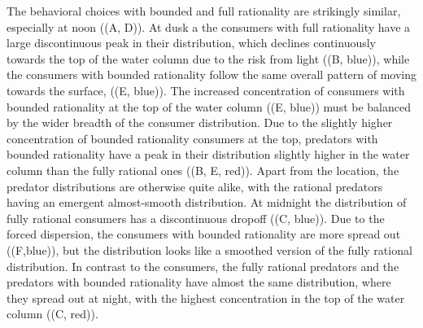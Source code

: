 The behavioral choices with bounded and full rationality are strikingly similar, especially at noon ((A, D)). At dusk a the consumers with full rationality have a large discontinuous peak in their distribution, which declines continuously towards the top of the water column due to the risk from light ((B, blue)), while the consumers with bounded rationality follow the same overall pattern of moving towards the surface, ((E, blue)). The increased concentration of consumers with bounded rationality at the top of the water column ((E, blue)) must be balanced by the wider breadth of the consumer distribution. Due to the slightly higher concentration of bounded rationality consumers at the top, predators with bounded rationality have a peak in their distribution slightly higher in the water column than the fully rational ones ((B, E, red)). Apart from the location, the predator distributions are otherwise quite alike, with the rational predators having an emergent almost-smooth distribution.
At midnight the distribution of fully rational consumers has a discontinuous dropoff ((C, blue)). Due to the forced dispersion, the consumers with bounded rationality are more spread out ((F,blue)), but the distribution looks like a smoothed version of the fully rational distribution.
In contrast to the consumers, the fully rational predators and the predators with bounded rationality have almost the same distribution, where they spread out at night, with the highest concentration in the top of the water column ((C, red)).





